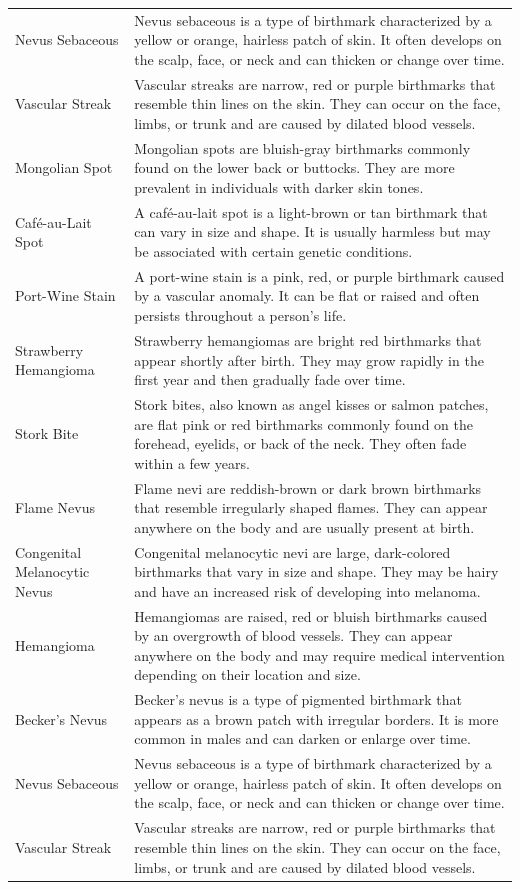 \begin{longtable}[]{@{}
  >{\raggedright\arraybackslash}p{}
  >{\raggedright\arraybackslash}p{}@{}}
Nevus Sebaceous & Nevus sebaceous is a type of birthmark characterized
by a yellow or orange, hairless patch of skin. It often develops on the
scalp, face, or neck and can thicken or change over time. \\
Vascular Streak & Vascular streaks are narrow, red or purple birthmarks
that resemble thin lines on the skin. They can occur on the face, limbs,
or trunk and are caused by dilated blood vessels. \\
Mongolian Spot & Mongolian spots are bluish-gray birthmarks commonly
found on the lower back or buttocks. They are more prevalent in
individuals with darker skin tones. \\
Café-au-Lait Spot & A café-au-lait spot is a light-brown or tan
birthmark that can vary in size and shape. It is usually harmless but
may be associated with certain genetic conditions. \\
Port-Wine Stain & A port-wine stain is a pink, red, or purple birthmark
caused by a vascular anomaly. It can be flat or raised and often
persists throughout a person's life. \\
Strawberry Hemangioma & Strawberry hemangiomas are bright red birthmarks
that appear shortly after birth. They may grow rapidly in the first year
and then gradually fade over time. \\
Stork Bite & Stork bites, also known as angel kisses or salmon patches,
are flat pink or red birthmarks commonly found on the forehead, eyelids,
or back of the neck. They often fade within a few years. \\
Flame Nevus & Flame nevi are reddish-brown or dark brown birthmarks that
resemble irregularly shaped flames. They can appear anywhere on the body
and are usually present at birth. \\
Congenital Melanocytic Nevus & Congenital melanocytic nevi are large,
dark-colored birthmarks that vary in size and shape. They may be hairy
and have an increased risk of developing into melanoma. \\
Hemangioma & Hemangiomas are raised, red or bluish birthmarks caused by
an overgrowth of blood vessels. They can appear anywhere on the body and
may require medical intervention depending on their location and
size. \\
Becker's Nevus & Becker's nevus is a type of pigmented birthmark that
appears as a brown patch with irregular borders. It is more common in
males and can darken or enlarge over time. \\
Nevus Sebaceous & Nevus sebaceous is a type of birthmark characterized
by a yellow or orange, hairless patch of skin. It often develops on the
scalp, face, or neck and can thicken or change over time. \\
Vascular Streak & Vascular streaks are narrow, red or purple birthmarks
that resemble thin lines on the skin. They can occur on the face, limbs,
or trunk and are caused by dilated blood vessels. \\
\bottomrule
\end{longtable}


